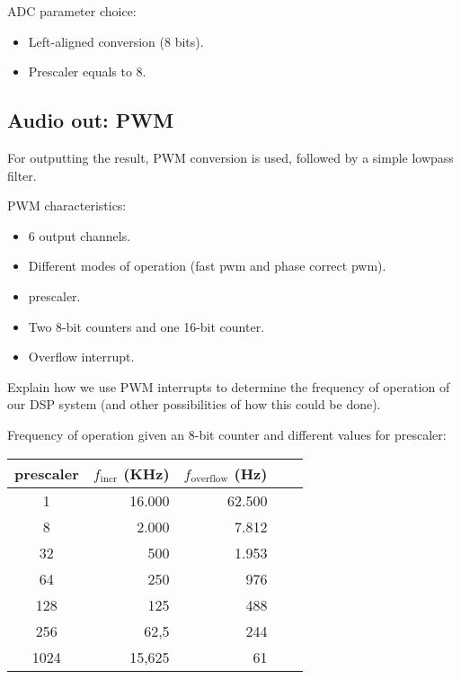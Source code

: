 ADC parameter choice:

\begin{itemize}
    \item Left-aligned conversion (8 bits).
    \item Prescaler equals to 8.
\end{itemize}

\subsection{Audio out: PWM}
\label{sec:pwm}

For outputting the result, PWM conversion is used, followed by a simple
lowpass filter.

PWM characteristics:

\begin{itemize}
    \item 6 output channels.
    \item Different modes of operation (fast pwm and phase correct pwm).
    \item prescaler.
    \item Two 8-bit counters and one 16-bit counter.
    \item Overflow interrupt.
\end{itemize}


Explain how we use PWM interrupts to determine the frequency of operation of
our DSP system (and other possibilities of how this could be done).

Frequency of operation given an 8-bit counter and different values for
prescaler:

\begin{center}
\begin{tabular}{crrrr}
\toprule
\toprule
\footnotesize{prescaler} &
\footnotesize{$f_\text{incr}$ (KHz)} &
\footnotesize{$f_\text{overflow}$ (Hz)}  \\
\midrule
1 & 16.000 & 62.500 \\
8 & 2.000 & 7.812 \\
32 & 500 & 1.953 \\
64 & 250 & 976 \\
128 & 125 & 488 \\
256 & 62,5 & 244 \\
1024 & 15,625 & 61 \\
\bottomrule
\end{tabular}
\end{center}

